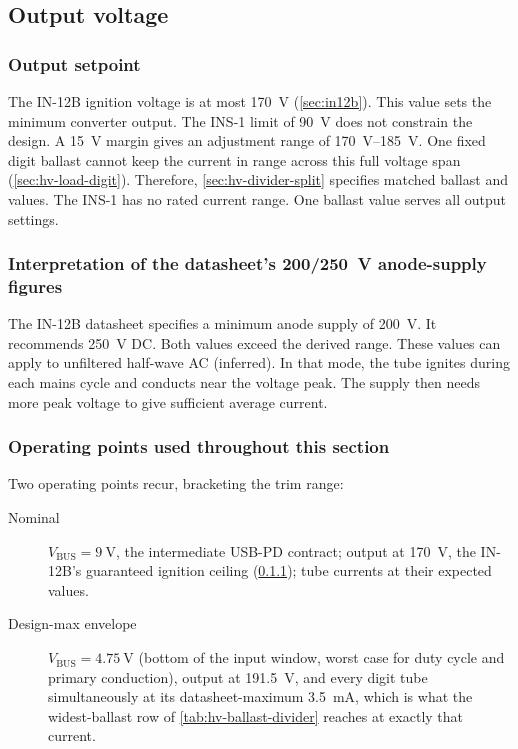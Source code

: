 \subsection{Output voltage}\label{sec:hv-setpoint}

\subsubsection{Output setpoint}\label{sec:hv-ignition}

The IN-12B ignition voltage is at most \SI{170}{\volt}
(\cref{sec:in12b}). This value sets the minimum converter output. The INS-1
limit of \SI{90}{\volt} does not constrain the design. A
\SI{15}{\volt} margin gives an adjustment range of
\SIrange{170}{185}{\volt}. One fixed digit ballast cannot keep the current in
range across this full voltage span (\cref{sec:hv-load-digit}). Therefore,
\cref{sec:hv-divider-split} specifies matched ballast and  values.
The INS-1 has no rated current range. One ballast value serves all output
settings.

\subsubsection{Interpretation of the datasheet's 200/250~V anode-supply figures}\label{sec:hv-anode-figures}

The IN-12B datasheet specifies a minimum anode supply of \SI{200}{\volt}. It
recommends \SI{250}{\volt} DC. Both values exceed the derived range. These
values can apply to unfiltered half-wave AC (inferred). In that mode, the tube
ignites during each mains cycle and conducts near the voltage peak. The supply
then needs more peak voltage to give sufficient average current.

\subsubsection{Operating points used throughout this section}\label{sec:hv-points}

Two operating points recur, bracketing the trim range:
\begin{description}
  \item[Nominal] $V_{\mathrm{BUS}} = \SI{9}{\volt}$, the intermediate USB-PD
  contract; output at \SI{170}{\volt}, the IN-12B's guaranteed ignition ceiling
  (\cref{sec:hv-ignition}); tube currents at their expected values.
  \item[Design-max envelope] $V_{\mathrm{BUS}} = \SI{4.75}{\volt}$ (bottom of
    the input window, worst case for duty cycle and primary conduction), output
    at \SI{191.5}{\volt}, and every digit tube simultaneously at its
    datasheet-maximum \SI{3.5}{\milli\ampere}, which is what the widest-ballast
    row of \cref{tab:hv-ballast-divider} reaches at exactly that current.
\end{description}

